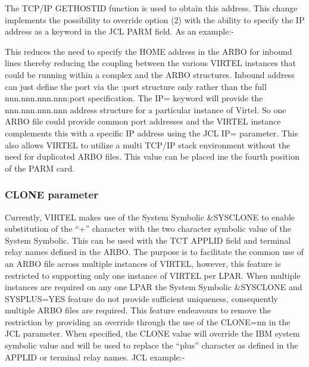 \documentclass[letterpaper,10pt,english]{sphinxmanual}
\begin{document}
The TCP/IP GETHOSTID function is used to obtain this address. This change implements the possibility to override
option (2) with the ability to specify the IP address as a keyword in the JCL PARM field. As an example:-

\begin{sphinxVerbatim}[commandchars=\\\{\}]
  
\end{sphinxVerbatim}

This reduces the need to specify the HOME address in the ARBO for inbound lines thereby reducing the coupling between the various VIRTEL instances that could be running within a complex and the ARBO structures. Inbound address can just define the port via the :port structure only rather than the full nnn.nnn.nnn.nnn:port specification. The IP= keyword will provide the nnn.nnn.nnn.nnn address structure for a particular instance of Virtel. So one ARBO file could provide common port addresses and the VIRTEL instance complements this with a specific IP address using the JCL IP= parameter. This also allows VIRTEL to utilize a multi TCP/IP stack environment without the need for duplicated ARBO files. This value can be placed ine the fourth position of the PARM card.

\ignorespaces 

\subsubsection{CLONE parameter}
\label{\detokenize{Installation_Guide:clone-parameter}}\label{\detokenize{Installation_Guide:index-15}}
Currently, VIRTEL makes use of the System Symbolic \&SYSCLONE to enable substitution of the “+” character with the two character symbolic value of the System Symbolic. This can be used with the TCT APPLID field and terminal relay names defined in the ARBO. The purpose is to facilitate the common use of an ARBO file across multiple instances of VIRTEL, however, this feature is restricted to supporting only one instance of VIRTEL per LPAR. When multiple instances are required on any one LPAR the System Symbolic \&SYSCLONE and SYSPLUS=YES feature do not provide sufficient uniqueness, consequently multiple ARBO files are required. This feature endeavours to remove the restriction by providing an override through the use of the CLONE=nn in the JCL parameter. When specified, the CLONE value will override the IBM system symbolic value and will be used to replace the “plus” character as defined in the APPLID or terminal relay names. JCL example:-
\end{document}
